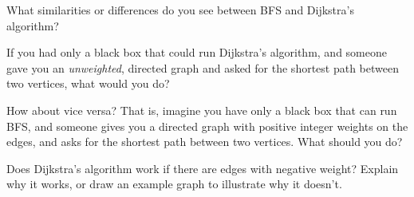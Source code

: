\documentclass{tufte-handout}
\begin{document}
\begin{questions}
\item What similarities or differences do you see between BFS and
  Dijkstra's algorithm?
\item If you had only a black box that could run Dijkstra's algorithm,
  and someone gave you an \emph{unweighted}, directed graph and asked
  for the shortest path between two vertices, what would you do?
\item How about vice versa?  That is, imagine you have only a black
  box that can run BFS, and someone gives you a directed graph with
  positive integer weights on the edges, and asks for the shortest
  path between two vertices.  What should you do?
\item Does Dijkstra's algorithm work if there are edges with negative
  weight?  Explain why it works, or draw an example graph to illustrate
  why it doesn't.
\end{questions}
\end{document}
